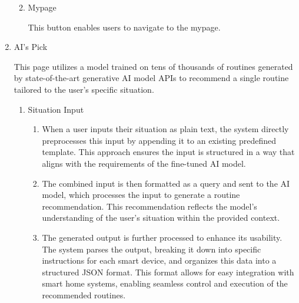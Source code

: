 \documentclass[conference]{IEEEtran}
\begin{document}
\begin{enumerate}[label=\arabic*]
\begin{enumerate}[label=\arabic*)]
        \vspace{0.5em}

        \item Mypage\par
        \vspace{0.3em}
        This button enables users to navigate to the mypage.
    \end{enumerate}
    
    \vspace{1em}

    \item AI's Pick\par
    \vspace{0.3em}
    This page utilizes a model trained on tens of thousands of routines generated by state-of-the-art generative AI model APIs to recommend a single routine tailored to the user's specific situation.
    \vspace{0.3em}

    \begin{enumerate}[label=\arabic*)]
        \item Situation Input\par
        \vspace{0.3em}

        \begin{enumerate}[label=\alph*)]
            \item When a user inputs their situation as plain text, the system directly preprocesses this input by appending it to an existing predefined template. This approach ensures the input is structured in a way that aligns with the requirements of the fine-tuned AI model.

            \vspace{0.5em}

            \item The combined input is then formatted as a query and sent to the AI model, which processes the input to generate a routine recommendation. This recommendation reflects the model’s understanding of the user’s situation within the provided context.

            \vspace{0.5em}

            \item The generated output is further processed to enhance its usability. The system parses the output, breaking it down into specific instructions for each smart device, and organizes this data into a structured JSON format. This format allows for easy integration with smart home systems, enabling seamless control and execution of the recommended routines.
        \end{enumerate}


\end{enumerate}
\end{enumerate}
\end{document}

